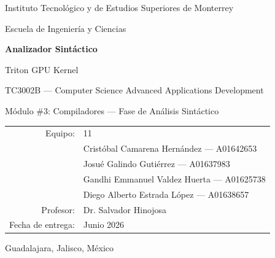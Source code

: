 \begin{titlepage}
\centering
{\large Instituto Tecnológico y de Estudios Superiores de Monterrey\par}
{\large Escuela de Ingeniería y Ciencias\par}
\vspace{1.2cm}
{\huge\bfseries Analizador Sintáctico\par}
{\Large Triton GPU Kernel\par}
\vspace{0.6cm}
{\large TC3002B --- Computer Science Advanced Applications Development\par}
{\large Módulo \#3: Compiladores --- Fase de Análisis Sintáctico\par}
\vfill
\begin{tabular}{rl}
Equipo: & 11 \\
 & Cristóbal Camarena Hernández --- A01642653 \\
 & Josué Galindo Gutiérrez --- A01637983 \\
 & Gandhi Emmanuel Valdez Huerta --- A01625738 \\
 & Diego Alberto Estrada López --- A01638657 \\
Profesor: & Dr. Salvador Hinojosa \\
Fecha de entrega: & Junio 2026 \\
\end{tabular}
\vfill
{\large Guadalajara, Jalisco, México\par}
\end{titlepage}
\setcounter{page}{1}
